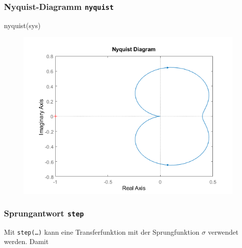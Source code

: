 \documentclass[
  10pt,
  a4paper,
]{article}
\newenvironment{Shaded}{}{}
\newcommand{\NormalTok}[1]{\textcolor[rgb]{0.14,0.16,0.18}{#1}}
\newcommand{\VariableTok}[1]{\textcolor[rgb]{0.89,0.38,0.04}{#1}}
\numberwithin{equation}{section}
\begin{document}
\begin{multicols}{2}
\begin{figure}[H]
{}

\end{figure}

\hypertarget{nyquist-diagramm-nyquist}{%
\subsubsection{\texorpdfstring{Nyquist-Diagramm
\texttt{nyquist}}{Nyquist-Diagramm nyquist}}\label{nyquist-diagramm-nyquist}}

\begin{Shaded}
\begin{Highlighting}[]
\VariableTok{nyquist}\NormalTok{(}\VariableTok{sys}\NormalTok{)}
\end{Highlighting}
\end{Shaded}

\begin{figure}[H]

{\centering \includegraphics{images/matlab_NyquistPlotResponse.png.png}

}

\end{figure}

\hypertarget{sprungantwort-step}{%
\subsubsection{\texorpdfstring{Sprungantwort
\texttt{step}}{Sprungantwort step}}\label{sprungantwort-step}}

Mit \texttt{step(…)} kann eine Transferfunktion mit der Sprungfunktion
\(\sigma\) verwendet werden. Damit


\end{multicols}
\end{document}
